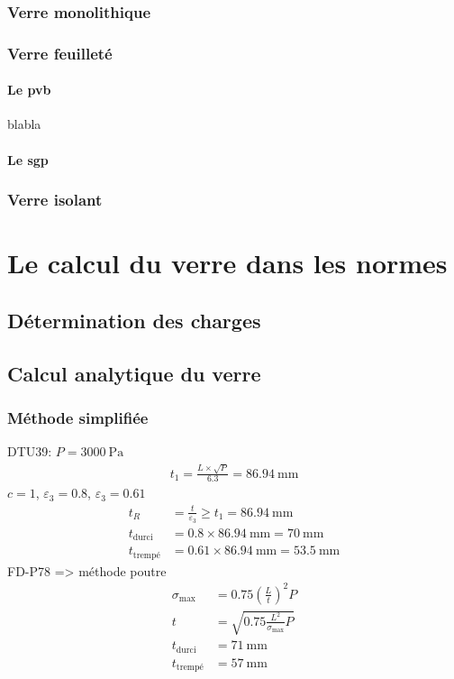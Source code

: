 \documentclass[11pt,titlepage]{article}
\begin{document}
\subsubsection{Verre monolithique}
\subsubsection{Verre feuilleté}
\paragraph{Le \acrshort{pvb}}
blabla
\paragraph{Le \acrshort{sgp}}
\subsubsection{Verre isolant}
\newpage
\section{Le calcul du verre dans les normes}
\subsection{Détermination des charges}
\subsection{Calcul analytique du verre}
\subsubsection{Méthode simplifiée}
DTU39: $P = \qty{3000}{\pascal}$
\begin{align}
    t_1 = \frac{L \times \sqrt{P}}{6.3} = \qty{86.94}{\milli\meter}
\end{align}
$c=1$, $\varepsilon_3 = 0.8$, $\varepsilon_3 = 0.61$
\begin{align}
    t_R &= \frac{t}{\varepsilon_3} \geq t_1 =  \qty{86.94}{\milli\meter}\\ 
    t_{\text{durci}} &= 0.8\times \qty{86.94}{\milli\meter}= \qty{70}{\milli\meter}\\
    t_{\text{trempé}} &= 0.61 \times \qty{86.94}{\milli\meter} = \qty{53.5}{\milli\meter}
\end{align}
FD-P78 => méthode poutre
\begin{align}
    \sigma_{\text{max}} &= 0.75\left (\frac{L}{t}\right)^2 P \\
    t &= \sqrt{0.75\frac{L^2}{\sigma_{\text{max}}}P}\\
     t_{\text{durci}} &= \qty{71}{\milli\meter}\\
    t_{\text{trempé}} &= \qty{57}{\milli\meter}
\end{align}
\end{document}
